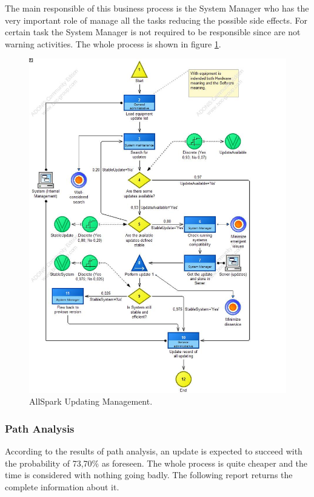 The main responsible of this business process is the System Manager who has the very important role of manage all the tasks reducing the possible side effects. For certain task the System Manager is not required to be responsible since are not warning activities. The whole process is shown in figure \ref{2img:updating}.

\begin{figure}[ht!]
\begin{centering}
\includegraphics[scale=0.50]{assign2/adonis/imgs/updating.jpg}
\caption{AllSpark Updating Management.}
\label{2img:updating}
\end{centering}
\end{figure}


\subsubsection{Path Analysis}
According to the results of path analysis, an update is expected to succeed with the probability of 73,70\% as foreseen. The whole process is quite cheaper and the time is considered with nothing going badly. The following report returns the complete information about it.

